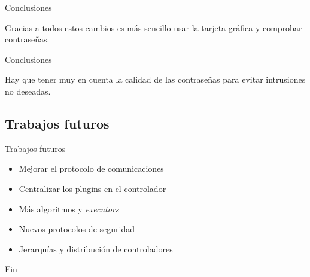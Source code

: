 \documentclass[12pt]{beamer}
\begin{document}
\begin{frame}{Conclusiones}
	\begin{center}
		Gracias a todos estos cambios es más sencillo usar la tarjeta gráfica y comprobar contraseñas.
	\end{center}
\end{frame}

\begin{frame}{Conclusiones}
	\begin{center}
		Hay que tener muy en cuenta la calidad de las contraseñas para evitar intrusiones no deseadas.
	\end{center}
\end{frame}

\subsection{Trabajos futuros}
\begin{frame}{Trabajos futuros}
	\begin{itemize}
		\item Mejorar el protocolo de comunicaciones
		\item Centralizar los plugins en el controlador
		\item Más algoritmos y \emph{executors}
		\item Nuevos protocolos de seguridad
		\item Jerarquías y distribución de controladores
	\end{itemize}
\end{frame}

\begin{frame}
	\begin{center}
		\Huge Fin
	\end{center}
\end{frame}

%	
%	
\end{document}
